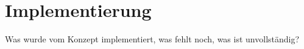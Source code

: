\chapter{Implementierung}\label{implementierung-abgrenzung}
Was wurde vom Konzept implementiert, was fehlt noch, was ist unvollständig?

\blindtext

\blindtext

\blindtext